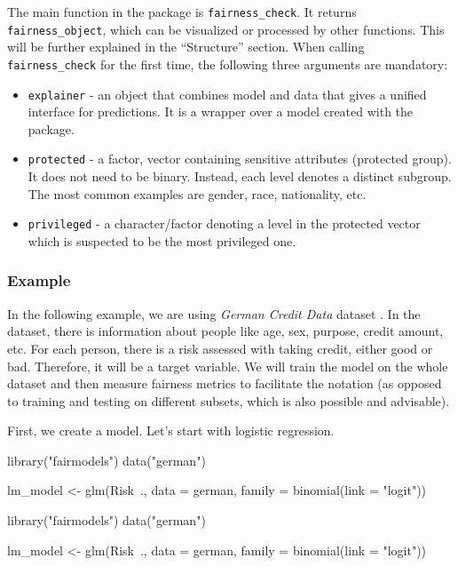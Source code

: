 The main function in the  package is
\texttt{fairness\_check}. It returns \texttt{fairness\_object}, which
can be visualized or processed by other functions. This will be further
explained in the ``Structure'' section. When calling
\texttt{fairness\_check} for the first time, the following three
arguments are mandatory:

\begin{itemize}
\tightlist
\item
  \texttt{explainer} - an object that combines model and data that gives
  a unified interface for predictions. It is a wrapper over a model
  created with the  \citep{JMLRv19} package.
\item
  \texttt{protected} - a factor, vector containing sensitive attributes
  (protected group). It does not need to be binary. Instead, each level
  denotes a distinct subgroup. The most common examples are gender,
  race, nationality, etc.
\item
  \texttt{privileged} - a character/factor denoting a level in the
  protected vector which is suspected to be the most privileged one.
\end{itemize}

\hypertarget{example}{%
\subsubsection{Example}\label{example}}

In the following example, we are using \emph{German Credit Data} dataset
\citep{Dua2019}. In the dataset, there is information about people like
age, sex, purpose, credit amount, etc. For each person, there is a risk
assessed with taking credit, either good or bad. Therefore, it will be a
target variable. We will train the model on the whole dataset and then
measure fairness metrics to facilitate the notation (as opposed to
training and testing on different subsets, which is also possible and
advisable).

First, we create a model. Let's start with logistic regression.

\begin{Schunk}
\begin{Sinput}
library("fairmodels")
data("german")

lm_model <- glm(Risk~., data = german, family = binomial(link = "logit"))
\end{Sinput}
\end{Schunk}

\begin{example}
library("fairmodels")
data("german")

lm_model <- glm(Risk~., data = german, family = binomial(link = "logit"))
\end{example}

